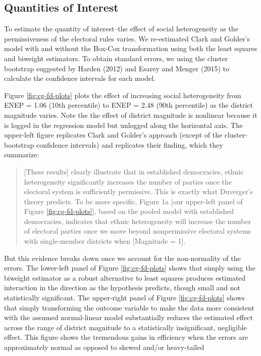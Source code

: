 \documentclass[12pt]{article}
\begin{document}
\subsection*{Quantities of Interest}

To estimate the quantity of interest--the effect of social heterogeneity as the permissiveness of the electoral rules varies. We re-estimated Clark and Golder's model with and without the Box-Cox transformation using both the least squares and biweight estimators. To obtain standard errors, we using the cluster bootstrap suggested by Harden (2012) and Esarey and Menger (2015) to calculate the confidence intervals for each model.

Figure \ref{fig:cg-fd-plots} plots the effect of increasing social heterogeneity from ENEP = 1.06 (10th percentile) to ENEP = 2.48 (90th percentile) as the district magnitude varies. Note the the effect of district magnitude is nonlinear because it is logged in the regression model but unlogged along the horizontal axis. The upper-left figure replicates Clark and Golder's approach (except of the cluster-bootstrap confidence intervals) and replicates their finding, which they summarize:

\begin{quote}
[These results] clearly illustrate that in established democracies, ethnic heterogeneity significantly increases the number of parties once the electoral system is sufficiently permissive. This is exactly what Duverger's theory predicts. To be more specific, Figure 1a [our upper-left panel of Figure \ref{fig:cg-fd-plots}], based on the pooled model with established democracies, indicates that ethnic heterogeneity will increase the number of electoral parties once we move beyond nonpermissive electoral systems with single-member districts when [Magnitude = 1].
\end{quote}

But this evidence breaks down once we account for the non-normality of the errors. The lower-left panel of Figure \ref{fig:cg-fd-plots} shows that simply using the biweight estimator as a robust alternative to least squares produces estimated interaction in the  direction as the hypothesis predicts, though small and not statistically significant. The upper-right panel of Figure \ref{fig:cg-fd-plots} shows that simply transforming the outcome variable to make the data more consistent with the assumed normal-linear model substantially reduces the estimated effect across the range of district magnitude to a statistically insignificant, negligible effect. This figure shows the tremendous gains in efficiency when the errors are approximately normal as opposed to skewed and/or heavy-tailed
\end{document}
